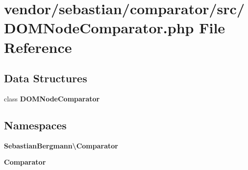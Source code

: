 \section{vendor/sebastian/comparator/src/\+D\+O\+M\+Node\+Comparator.php File Reference}
\label{_d_o_m_node_comparator_8php}
\subsection*{Data Structures}
\begin{DoxyCompactItemize}
\item 
class {\bf D\+O\+M\+Node\+Comparator}
\end{DoxyCompactItemize}
\subsection*{Namespaces}
\begin{DoxyCompactItemize}
\item 
 {\bf Sebastian\+Bergmann\textbackslash{}\+Comparator}
\item 
 {\bf Comparator}
\end{DoxyCompactItemize}
